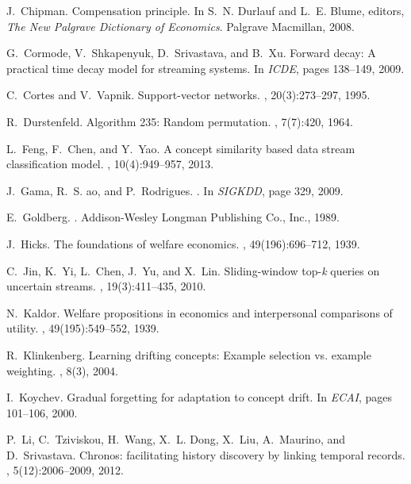 \documentclass[twoside,leqno,twocolumn]{article}
\begin{document}
\begin{thebibliography}{10}
J.~Chipman.
\newblock Compensation principle.
\newblock In S.~N. Durlauf and L.~E. Blume, editors, {\em The New Palgrave
  Dictionary of Economics}. Palgrave Macmillan, 2008.

G.~Cormode, V.~Shkapenyuk, D.~Srivastava, and B.~Xu.
\newblock Forward decay: A practical time decay model for streaming systems.
\newblock In {\em ICDE}, pages 138--149, 2009.

C.~Cortes and V.~Vapnik.
\newblock Support-vector networks.
, 20(3):273--297, 1995.

R.~Durstenfeld.
\newblock Algorithm 235: Random permutation.
, 7(7):420, 1964.

L.~Feng, F.~Chen, and Y.~Yao.
\newblock A concept similarity based data stream classification model.
,
  10(4):949--957, 2013.

J.~Gama, R.~S. {a}o, and P.~Rodrigues.
.
\newblock In {\em SIGKDD}, page 329, 2009.

E.~Goldberg.
.
\newblock Addison-Wesley Longman Publishing Co., Inc., 1989.

J.~Hicks.
\newblock The foundations of welfare economics.
, 49(196):696--712, 1939.

C.~Jin, K.~Yi, L.~Chen, J.~Yu, and X.~Lin.
\newblock Sliding-window top-{\it k} queries on uncertain streams.
, 19(3):411--435, 2010.

N.~Kaldor.
\newblock Welfare propositions in economics and interpersonal comparisons of
  utility.
, 49(195):549--552, 1939.

R.~Klinkenberg.
\newblock Learning drifting concepts: Example selection vs. example weighting.
, 8(3), 2004.

I.~Koychev.
\newblock Gradual forgetting for adaptation to concept drift.
\newblock In {\em ECAI}, pages 101--106, 2000.

P.~Li, C.~Tziviskou, H.~Wang, X.~L. Dong, X.~Liu, A.~Maurino, and
  D.~Srivastava.
\newblock Chronos: facilitating history discovery by linking temporal records.
, 5(12):2006--2009, 2012.


\end{thebibliography}
\end{document}
